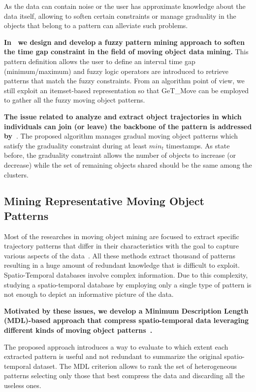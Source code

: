 As the data can contain noise or the user has approximate knowledge about the data itself, allowing to soften certain constraints or manage graduality in the objects that belong to a pattern can alleviate such problems.  

\textbf{In~\cite{HaiIPT12adma} we design and develop a fuzzy pattern mining approach to soften the time gap constraint in the field of moving object data mining.}  This pattern definition allows the user to define an interval time gap (minimum/maximum) and fuzzy logic operators are introduced to retrieve patterns that match the fuzzy constraints. From an algorithm point of view, we still exploit an itemset-based representation so that {\sc GeT\_Move} can be employed to gather all the fuzzy moving object patterns.

\textbf{The issue related to analyze and extract object trajectories in which individuals can join (or leave) the backbone of the pattern is addressed by~\cite{HaiIPT12}}. The proposed algorithm manages gradual moving object patterns which satisfy the graduality constraint during at least $min_t$ timestamps. As state before, the graduality constraint allows the number of objects to increase (or decrease) while the set of remaining objects shared should be the same among the clusters.


\subsection{Mining Representative Moving Object Patterns} 
Most of the researches in moving object mining are focused to extract specific trajectory patterns that differ in their characteristics with the goal to capture various aspects of the data~\cite{Jeung2008,Li2010,Wang2006,HaiIPT12}. All these methods extract thousand of patterns resulting in a huge amount of redundant knowledge that is difficult to exploit. Spatio-Temporal databases involve complex information. Due to this complexity, studying a spatio-temporal database by employing only a single type of pattern is not enough to depict an informative picture of the data.  

\textbf{Motivated by these issues, we develop a Minimum Description Length (MDL)-based approach that compress spatio-temporal data leveraging different kinds of moving object patterns~\cite{HaiIPT13}.} 


The proposed approach introduces a way to evaluate to which extent each extracted pattern is useful and not redundant to summarize  the original spatio-temporal dataset. The MDL criterion allows to rank the set of heterogeneous patterns selecting only those that best compress the data and discarding all the useless ones.







